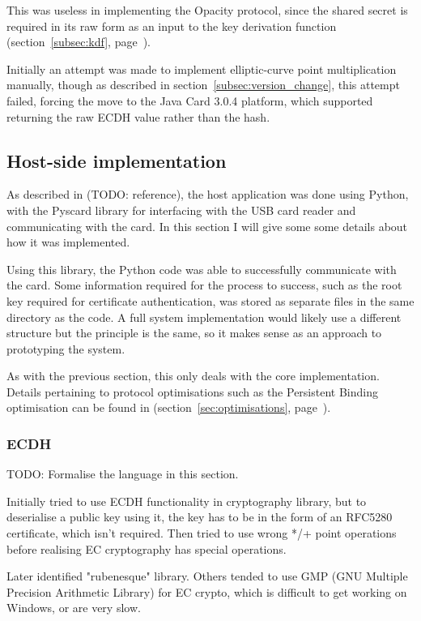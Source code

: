 \documentclass[12pt]{article}
\begin{document}
This was useless in implementing the Opacity protocol, since the shared secret is required in its raw form as an input to the key derivation function (section~\ref{subsec:kdf}, page~\pageref{subsec:kdf}).

Initially an attempt was made to implement elliptic-curve point multiplication manually, though as described in section~\ref{subsec:version_change}, this attempt failed, forcing the move to the Java Card 3.0.4 platform, which supported returning the raw ECDH value rather than the hash.

\subsection{Host-side implementation}
As described in (TODO: reference), the host application was done using Python, with the Pyscard library for interfacing with the USB card reader and communicating with the card. In this section I will give some some details about how it was implemented.

Using this library, the Python code was able to successfully communicate with the card. Some information required for the process to success, such as the root key required for certificate authentication, was stored as separate files in the same directory as the code. A full system implementation would likely use a different structure but the principle is the same, so it makes sense as an approach to prototyping the system.

As with the previous section, this only deals with the core implementation. Details pertaining to protocol optimisations such as the Persistent Binding optimisation can be found in (section~\ref{sec:optimisations}, page~\pageref{sec:optimisations}).

\subsubsection{ECDH}
TODO: Formalise the language in this section.

Initially tried to use ECDH functionality in cryptography library, but to deserialise a public key using it, the key has to be in the form of an RFC5280 certificate, which isn't required. Then tried to use wrong */+ point operations before realising EC cryptography has special operations. 

Later identified "rubenesque" library. Others tended to use GMP (GNU Multiple Precision Arithmetic Library) for EC crypto, which is difficult to get working on Windows, or are very slow. 
\end{document}
